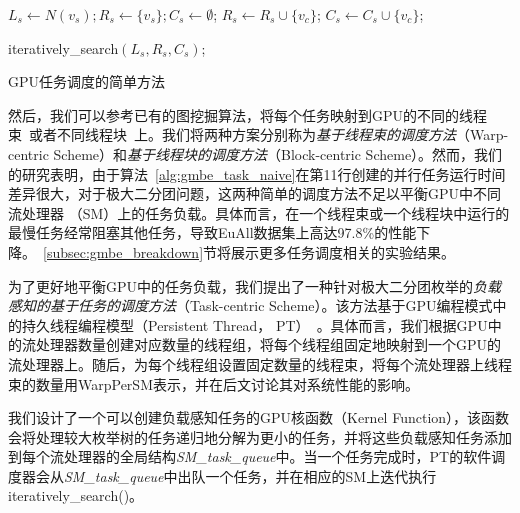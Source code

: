 \begin{algorithm} [H]
  \begin{algorithmic}[1]
    \normalsize
    
      \STATE $L_s \leftarrow N(v_s); R_s\leftarrow\{v_s\}; C_s\leftarrow \emptyset $;
          \STATE $R_s \leftarrow R_s \cup \{v_c\}$;
          \STATE $C_s \leftarrow C_s \cup \{v_c\}$;
        \ENDIF 
      \ENDFOR

        \STATE \textsf{iteratively\_search}$(L_s,R_s,C_s)$;
      \ENDIF

    \ENDFOR

  \end{algorithmic}
  \caption{GPU任务调度的简单方法}
  \label{alg:gmbe_task_naive}
\end{algorithm}


然后，我们可以参考已有的图挖掘算法，将每个任务映射到GPU的不同的线程束~\cite{g2miner22}或者不同线程块~\cite{Kclique22}上。我们将两种方案分别称为\textit{基于线程束的调度方法}（Warp-centric Scheme）和\textit{基于线程块的调度方法}（Block-centric Scheme）。然而，我们的研究表明，由于算法~\ref{alg:gmbe_task_naive}在第11行创建的并行任务运行时间差异很大，对于极大二分团问题，这两种简单的调度方法不足以平衡GPU中不同流处理器 （SM）上的任务负载。具体而言，在一个线程束或一个线程块中运行的最慢任务经常阻塞其他任务，导致EuAll数据集上高达97.8\%的性能下降。~\ref{subsec:gmbe_breakdown}节将展示更多任务调度相关的实验结果。




为了更好地平衡GPU中的任务负载，我们提出了一种针对极大二分团枚举的\textit{负载感知的基于任务的调度方法}（Task-centric Scheme）。该方法基于GPU编程模式中的持久线程编程模型（Persistent Thread， PT）~\cite{PersistentThread12}。具体而言，我们根据GPU中的流处理器数量创建对应数量的线程组，将每个线程组固定地映射到一个GPU的流处理器上。随后，为每个线程组设置固定数量的线程束，将每个流处理器上线程束的数量用\textsf{WarpPerSM}表示，并在后文讨论其对系统性能的影响。



我们设计了一个可以创建负载感知任务的GPU核函数（Kernel Function），该函数会将处理较大枚举树的任务递归地分解为更小的任务，并将这些负载感知任务添加到每个流处理器的全局结构\textit{SM\_task\_queue}中。当一个任务完成时，PT的软件调度器会从\textit{SM\_task\_queue}中出队一个任务，并在相应的SM上迭代执行\textsf{}{iteratively\_search()}。

